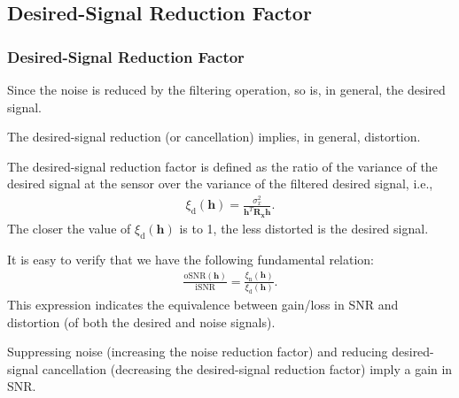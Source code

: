 \documentclass[10pt,pdflatex,headrule,landscape]{beamer}
\begin{document}
\subsection{Desired-Signal Reduction Factor}
\begin{frame}
 \frametitle{Desired-Signal Reduction Factor}

Since the noise is reduced by the filtering operation, so is, in general, the desired signal.

The desired-signal reduction (or cancellation) implies, in general, distortion.

The desired-signal reduction factor is defined as the ratio of the variance of the desired signal at the
sensor over the variance of the filtered desired signal, i.e.,
\begin{eqnarray}
\label{C2-SRF}
 \xi_{\mathrm{d}}\left(\mathbf{h} \right) = \frac{ \sigma_x^2 } { \mathbf{h}^T \mathbf{R}_{\mathbf{x}} \mathbf{h} }.
\end{eqnarray}
The closer the value of $\xi_{\mathrm{d}}\left(\mathbf{h} \right)$ is to 1, the less distorted is the desired signal.

\end{frame}

\begin{frame}
It is easy to verify that we have the following fundamental relation:
\begin{eqnarray}
\label{C2-fund-rel}
 \frac{ \mathrm{oSNR}\left(\mathbf{h} \right) } { \mathrm{iSNR} } = \frac{ \xi_{\mathrm{n}}\left(\mathbf{h} \right) }
 { \xi_{\mathrm{d}}\left(\mathbf{h} \right) }.
\end{eqnarray}
This expression indicates the equivalence between gain/loss in SNR and distortion (of both the desired and noise signals).

Suppressing noise (increasing the noise reduction factor) and reducing desired-signal cancellation (decreasing the desired-signal reduction factor)
imply a gain in SNR.

\end{frame}
\end{document}
